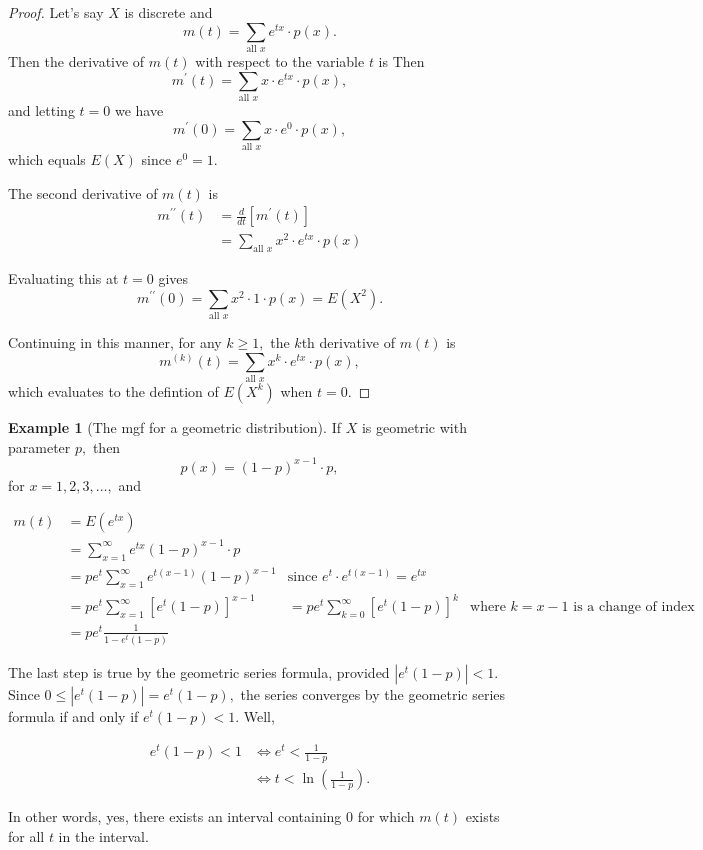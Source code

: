 \documentclass[
]{book}
\theoremstyle{definition}
\theoremstyle{definition}
\newtheorem{example}{Example}[chapter]
\theoremstyle{definition}
\theoremstyle{definition}
\theoremstyle{remark}
\begin{document}
\begin{proof}
Let's say \(X\) is discrete and \[m(t) = \sum_{\text{all }x} e^{tx}\cdot p(x).\]
Then the derivative of \(m(t)\) with respect to the variable \(t\) is
Then \[m^\prime(t) = \sum_{\text{all }x} x\cdot e^{tx}\cdot p(x),\]
and letting \(t = 0\) we have
\[m^\prime(0) = \sum_{\text{all }x} x\cdot e^{0}\cdot p(x),\] which equals \(E(X)\) since \(e^0 = 1\).

The second derivative of \(m(t)\) is
\begin{align*}
m^{\prime\prime}(t) &= \frac{d}{dt}\left[m^\prime(t)\right]\\
  &=\sum_{\text{all }x} x^2\cdot e^{tx}\cdot p(x)
\end{align*}

Evaluating this at \(t = 0\) gives \[m^{\prime\prime}(0)=\sum_{\text{all }x} x^2\cdot 1 \cdot p(x) = E(X^2).\]

Continuing in this manner, for any \(k \geq 1,\) the \(k\)th derivative of \(m(t)\) is \[m^{(k)}(t)=\sum_{\text{all }x} x^k\cdot e^{tx}\cdot p(x),\] which evaluates to the defintion of \(E(X^k)\) when \(t = 0\).
\end{proof}

\begin{example}[The mgf for a geometric distribution]
\protect\hypertarget{exm:mgf-geometric}{}\label{exm:mgf-geometric}If \(X\) is geometric with parameter \(p,\) then \[p(x) = (1-p)^{x-1}\cdot p,\] for \(x = 1, 2, 3, \ldots,\) and

\begin{align*}
m(t) &= E(e^{tx})\\
  &= \sum_{x = 1}^\infty e^{tx}(1-p)^{x-1}\cdot p\\
  &= pe^t \sum_{x=1}^\infty e^{t(x-1)}(1-p)^{x-1} &\text{since }e^t\cdot e^{t(x-1)} = e^{tx}\\
  &= pe^t \sum_{x=1}^\infty[e^t(1-p)]^{x-1}
  &= pe^t \sum_{k=0}^\infty[e^t(1-p)]^{k} &\text{where }k=x-1 \text{ is a change of index}\\
  &= pe^t\frac{1}{1-e^t(1-p)} 
\end{align*}

The last step is true by the geometric series formula, provided \(|e^t(1-p)|<1\).
Since \(0\leq |e^t(1-p)| = e^t(1-p),\) the series converges by the geometric series formula if and only if \(e^t(1-p) < 1\). Well,

\begin{align*}
e^t(1-p) < 1 &\iff e^t < \frac{1}{1-p} \\
 &\iff t < \ln\left(\frac{1}{1-p}\right).
\end{align*}

In other words, yes, there exists an interval containing 0 for which \(m(t)\) exists for all \(t\) in the interval.
\end{example}
\end{document}
